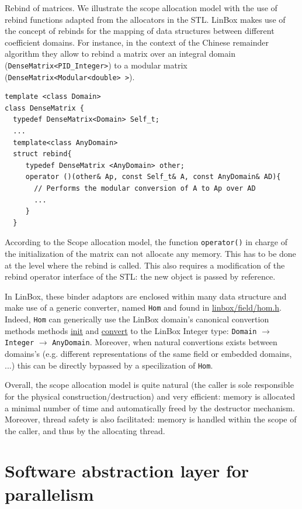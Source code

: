 \documentclass[runningheads,a4paper]{llncs}
\newcommand{\linbox}{{\sc LinBox}\xspace}
\begin{document}
\begin{paragraph}{Rebind of matrices.}
We illustrate the scope allocation model with the use of rebind
functions adapted from the allocators in the STL.
\linbox makes use of the concept of rebinds for the mapping of data
structures between different coefficient domains.
For instance, in the context of the Chinese remainder algorithm they
allow to rebind a matrix over an integral domain
(\texttt{DenseMatrix<PID\_Integer>}) to a modular matrix
(\texttt{DenseMatrix<Modular<double> >}).
\begin{verbatim}
template <class Domain>
class DenseMatrix {
  typedef DenseMatrix<Domain> Self_t;
  ... 
  template<class AnyDomain>
  struct rebind{ 
     typedef DenseMatrix <AnyDomain> other;
     operator ()(other& Ap, const Self_t& A, const AnyDomain& AD){
       // Performs the modular conversion of A to Ap over AD
       ...
     } 
  }  
\end{verbatim}

According to the Scope allocation model, the function
\texttt{operator()} in charge of the initialization of the matrix can
not allocate any memory. This has to be done at the level where the
rebind is called. This also requires a modification of the rebind
operator interface of the STL: the new object is passed by reference.

In \linbox, these binder adaptors are enclosed
within many data structure and make use of a generic
converter, named \texttt{Hom} and found in \url{linbox/field/hom.h}.
Indeed, \texttt{Hom} can generically use the \linbox domain's canonical
convertion methods methods \url{init} and \url{convert} to the \linbox
Integer type: \texttt{Domain} $\rightarrow$ \texttt{Integer}
$\rightarrow$ \texttt{AnyDomain}. 
Moreover, when natural convertions exists between domains's
(e.g. different representations of the same field or embedded domains,
...) this can be directly bypassed by a specilization of \texttt{Hom}.
\end{paragraph}

Overall, the scope allocation model is quite natural (the caller is
sole responsible for the physical construction/destruction) and very
efficient: memory is allocated a minimal number of time and
automatically freed by the destructor mechanism. Moreover, thread
safety is also facilitated: memory is handled within the scope of the
caller, and thus by the allocating thread.

\section{Software abstraction layer for parallelism}
\end{document}
